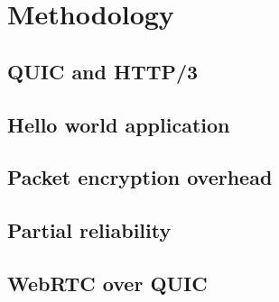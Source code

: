 \section{Methodology}
\label{sec:methodology}

\subsection{QUIC and HTTP/3}
\label{subsec:quic-and-http/3}

\subsection{Hello world application}
\label{subsec:hellow-world-application}

\subsection{Packet encryption overhead}
\label{subsec:packet-encryption-overhead}

\subsection{Partial reliability}
\label{subsec:partial-reliability}

\subsection{WebRTC over QUIC}
\label{subsec:webrtc-over-quic}

